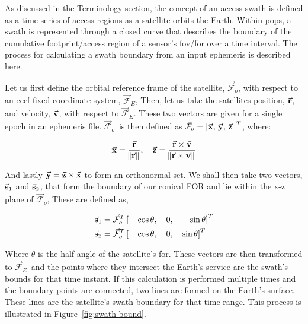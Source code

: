 As discussed in the Terminology section, the concept of an access swath is
defined as a time-series of access regions as a satellite orbits the Earth.
Within \gls{pops}, a swath is represented through a closed curve that describes
the boundary of the cumulative footprint/access region of a sensor’s
\gls{fov}/\gls{for} over a time interval. The process for calculating a swath
boundary from an input ephemeris is described here.  

\newcommand{\Fo}{$\vec{\mathcal{F}}_o$} 
\newcommand{\Fe}{$\vec{\mathcal{F}}_E$}

Let us first define the orbital reference frame of the satellite, \Fo, with
respect to an \gls{ecef} fixed coordinate system, \Fe,  Then, let us take the
satellites position, $\vec{\bm{\mathrm{r}}}$, and velocity, $\vec{\bm{\mathrm{v}}}$, with respect to \Fe.
These two vectors are given for a single epoch in an ephemeris file.  \Fo ~is
then defined as $ \vec{\mathcal{F}}_o = \left[ \vec{\bm{\mathrm{x}}}, \, \vec{\bm{\mathrm{y}}}, \, \vec{\bm{\mathrm{z}}}
\, \right]^T$, where:

\begin{equation} 
    \vec{\bm{\mathrm{x}}} = \frac{\vec{\bm{\mathrm{r}}}}{\norm{\vec{\bm{\mathrm{r}}}}}, 
    \quad 
    \vec{\bm{\mathrm{z}}} = \frac{\vec{\bm{\mathrm{r}}}\times\vec{\bm{\mathrm{v}}}}{\norm{\vec{\bm{\mathrm{r}}}\times\vec{\bm{\mathrm{v}}}}}
\end{equation}

And lastly $\vec{\bm{\mathrm{y}}} = \vec{\bm{\mathrm{z}}} \times \vec{\bm{\mathrm{x}}}$ to form an orthonormal set. We
shall then take two vectors, $\vec{\bm{\mathrm{s}}}_{1}$ and $\vec{\bm{\mathrm{s}}}_{2}$, that form the
boundary of our conical FOR and lie within the x-z plane of \Fo,  These are
defined as,

\begin{align}
    \vec{\bm{\mathrm{s}}}_{1} &= \vec{\mathcal{F}}_o^T \left[ \, -\cos\theta, \quad 0, \quad -\sin\theta \right]^T \\
    \vec{\bm{\mathrm{s}}}_{2} &= \vec{\mathcal{F}}_o^T \left[ \, -\cos\theta, \quad 0, \quad \sin\theta \right]^T
\end{align}

Where $\theta$ is the half-angle of the satellite’s \gls{for}. These vectors
are then transformed to \Fe~and the points where they intersect the Earth’s
service are the swath’s bounds for that time instant. If this calculation is
performed multiple times and the boundary points are connected, two lines are
formed on the Earth’s surface. These lines are the satellite’s swath boundary
for that time range.  This process is illustrated in
Figure~\ref{fig:swath-bound}.

%


